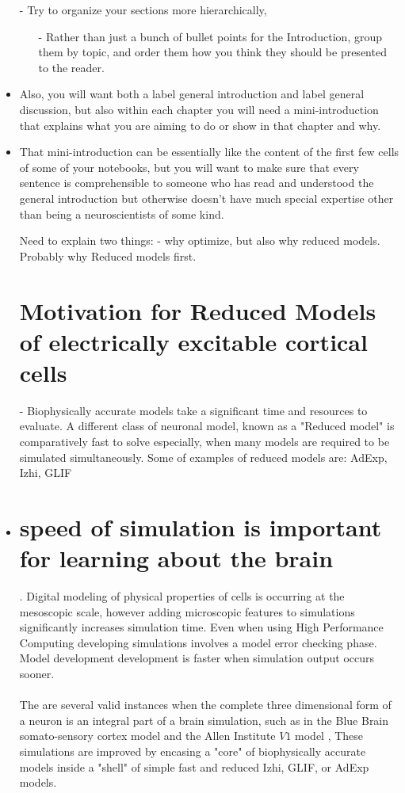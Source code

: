 \documentclass{article}
\begin{document}
\begin{itemize}
\item[-]  Try to organize your sections more hierarchically, \begin{itemize}

 \item[-] Rather than just a bunch of bullet points for the Introduction, group them by topic, and order them how you think they should be presented to the reader.  
\end{itemize}


\item Also, you will want both a label general introduction and label general discussion, but also within each chapter you will need a mini-introduction that explains what you are aiming to do or show in that chapter and why. 

\item That mini-introduction can be essentially like the content of the first few cells of some of your notebooks, but you will want to make sure that every sentence is comprehensible to someone who has read and understood the general introduction but otherwise doesn’t have much special expertise other than being a neuroscientists of some kind.


Need to explain two things:
- why optimize, but also why reduced models. Probably why Reduced models first.
\section{Motivation for Reduced Models of electrically excitable cortical cells}

\item[-] Biophysically accurate models take a significant time and resources to evaluate. A different class of neuronal model, known as a "Reduced model" is comparatively fast to solve especially, when many models are required to be simulated simultaneously. Some of examples of reduced models are: 
\subitem AdExp, Izhi, GLIF

\item \section{speed of simulation is important for learning about the brain}. Digital modeling of physical properties of cells is occurring at the mesoscopic scale, however adding microscopic features to simulations significantly increases simulation time. Even when using High Performance Computing developing simulations involves a model error checking phase. Model development development is faster when simulation output occurs sooner.\\
\\
The are several valid instances when the complete three dimensional form of a neuron is an integral part of a brain simulation, such as in the Blue Brain somato-sensory cortex model \cite{} and the Allen Institute $V1$ model \cite{}, These simulations are improved by encasing a "core" of biophysically accurate models inside a "shell" of simple fast and reduced Izhi, GLIF, or AdExp models. 


\end{itemize}
\end{document}
